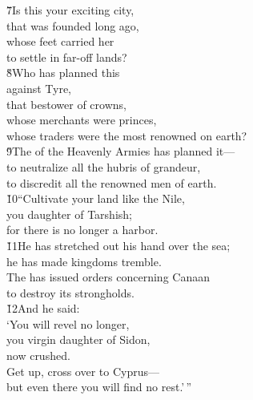 \begin{poetry}
\poeml \v{7}Is this your exciting city, \\
\poemll    that was founded long ago, \\
\poeml whose feet carried her \\
\poemll    to settle in far-off lands? \\
\poeml \v{8}Who has planned this \\
\poemll    against Tyre, \\
\poemlll       that bestower of crowns, \\
\poeml whose merchants were princes, \\
\poemll    whose traders were the most renowned on earth? \\
\poeml \v{9}The  of the Heavenly Armies has planned it--- \\
\poemll    to neutralize all the hubris of grandeur, \\
\poemlll       to discredit all the renowned men of earth. \\
\poeml \v{10}``Cultivate your land like the Nile, \\
\poemll    you daughter of Tarshish; \\
\poemlll       for there is no longer a harbor. \\
\poeml \v{11}He has stretched out his hand over the sea; \\
\poemll    he has made kingdoms tremble. \\
\poeml The  has issued orders concerning Canaan \\
\poemll    to destroy its strongholds. \\
\poeml \v{12}And he said: \\
\poeml `You will revel no longer, \\
\poemll    you virgin daughter of Sidon, \\
\poemlll       now crushed. \\
\poeml Get up, cross over to Cyprus--- \\
\poemll    but even there you will find no rest.'\,''
\end{poetry}

